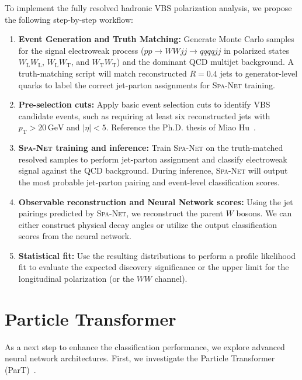 \documentclass[12pt]{article}
\begin{document}
        To implement the fully resolved hadronic VBS polarization analysis, we propose the following step-by-step workflow:
        \begin{enumerate}
            \item \textbf{Event Generation and Truth Matching:} Generate Monte Carlo samples for the signal electroweak process ($pp \to WWjj \to qqqqjj$ in polarized states $W_{\text{L}} W_{\text{L}}$, $W_{\text{L}} W_{\text{T}}$, and $W_{\text{T}} W_{\text{T}}$) and the dominant QCD multijet background. A truth-matching script will match reconstructed $R=0.4$ jets to generator-level quarks to label the correct jet-parton assignments for \textsc{Spa-Net} training.
            \item \textbf{Pre-selection cuts:} Apply basic event selection cuts to identify VBS candidate events, such as requiring at least six reconstructed jets with $p_{\text{T}} > 20\,\mathrm{GeV}$ and $|\eta| < 5$. Reference the Ph.D. thesis of Miao Hu~\cite{hu_2022}.
            \item \textbf{\textsc{Spa-Net} training and inference:} Train \textsc{Spa-Net} on the truth-matched resolved samples to perform jet-parton assignment and classify electroweak signal against the QCD background. During inference, \textsc{Spa-Net} will output the most probable jet-parton pairing and event-level classification scores.
            \item \textbf{Observable reconstruction and Neural Network scores:} Using the jet pairings predicted by \textsc{Spa-Net}, we reconstruct the parent $W$ bosons. We can either construct physical decay angles or utilize the output classification scores from the neural network.
            \item \textbf{Statistical fit:} Use the resulting distributions to perform a profile likelihood fit to evaluate the expected discovery significance or the upper limit for the longitudinal polarization (or the $WW$ channel).
        \end{enumerate}

    

\section{Particle Transformer}%
\label{sec:particle_transformer}

    As a next step to enhance the classification performance, we explore advanced neural network architectures. First, we investigate the Particle Transformer (ParT)~\cite{Qu:2022mxj}.
\end{document}
